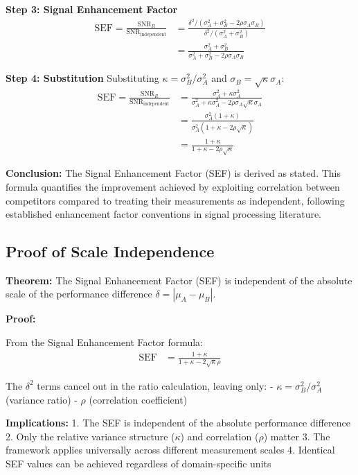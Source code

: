\textbf{Step 3: Signal Enhancement Factor}
\begin{align}
\text{SEF} = \frac{\text{SNR}_R}{\text{SNR}_{\text{independent}}} &= \frac{\delta^2/(\sigma_A^2 + \sigma_B^2 - 2\rho\sigma_A\sigma_B)}{\delta^2/(\sigma_A^2 + \sigma_B^2)} \\
&= \frac{\sigma_A^2 + \sigma_B^2}{\sigma_A^2 + \sigma_B^2 - 2\rho\sigma_A\sigma_B}
\end{align}

\textbf{Step 4: Substitution}
Substituting $\kappa = \sigma_B^2/\sigma_A^2$ and $\sigma_B = \sqrt{\kappa}\sigma_A$:
\begin{align}
\text{SEF} = \frac{\text{SNR}_R}{\text{SNR}_{\text{independent}}} &= \frac{\sigma_A^2 + \kappa\sigma_A^2}{\sigma_A^2 + \kappa\sigma_A^2 - 2\rho\sigma_A\sqrt{\kappa}\sigma_A} \\
&= \frac{\sigma_A^2(1 + \kappa)}{\sigma_A^2(1 + \kappa - 2\rho\sqrt{\kappa})} \\
&= \frac{1 + \kappa}{1 + \kappa - 2\rho\sqrt{\kappa}}
\end{align}

\textbf{Conclusion:} The Signal Enhancement Factor (SEF) is derived as stated. This formula quantifies the improvement achieved by exploiting correlation between competitors compared to treating their measurements as independent, following established enhancement factor conventions in signal processing literature.

\subsection{Proof of Scale Independence}

\textbf{Theorem:} The Signal Enhancement Factor (SEF) is independent of the absolute scale of the performance difference $\delta = |\mu_A - \mu_B|$.

\textbf{Proof:}

From the Signal Enhancement Factor formula:
\begin{align}
\text{SEF} &= \frac{1 + \kappa}{1 + \kappa - 2\sqrt{\kappa}\rho}
\end{align}

The $\delta^2$ terms cancel out in the ratio calculation, leaving only:
- $\kappa = \sigma_B^2/\sigma_A^2$ (variance ratio)
- $\rho$ (correlation coefficient)

\textbf{Implications:}
1. The SEF is independent of the absolute performance difference
2. Only the relative variance structure ($\kappa$) and correlation ($\rho$) matter
3. The framework applies universally across different measurement scales
4. Identical SEF values can be achieved regardless of domain-specific units

